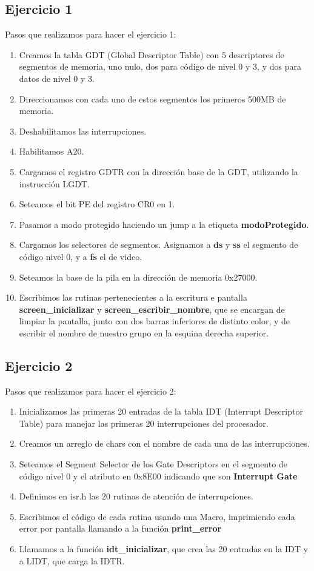 \documentclass[a4paper,10pt]{article}
\begin{document}
\subsection{Ejercicio 1}
Pasos que realizamos para hacer el ejercicio 1:
\begin{enumerate}
  \item Creamos la tabla GDT (Global Descriptor Table) con 5 descriptores de segmentos de memoria, uno nulo, dos para código de nivel 0 y 3, y dos para datos de nivel 0 y 3.
  \item Direccionamos con cada uno de estos segmentos los primeros 500MB de memoria.
  \item Deshabilitamos las interrupciones.
  \item Habilitamos A20.
  \item Cargamos el registro GDTR con la dirección base de la GDT, utilizando la instrucción LGDT.
  \item Seteamos el bit PE del registro CR0 en 1.
  \item Pasamos a modo protegido haciendo un jump a la etiqueta \textbf{modoProtegido}.
  \item Cargamos los selectores de segmentos. Asignamos a \textbf{ds} y \textbf{ss} el segmento de código nivel 0, y a \textbf{fs} el de video.
  \item Seteamos la base de la pila en la dirección de memoria 0x27000.
  \item Escribimos las rutinas pertenecientes a la escritura e pantalla \textbf{screen\_inicializar} y \textbf{screen\_escribir\_nombre}, que se encargan de limpiar la pantalla,
    junto con dos barras inferiores de distinto color, y de escribir el nombre de nuestro grupo en la esquina derecha superior. 
\end{enumerate}

\subsection{Ejercicio 2}
Pasos que realizamos para hacer el ejercicio 2:
\begin{enumerate}
  \item Inicializamos las primeras 20 entradas de la tabla IDT (Interrupt Descriptor Table) para manejar las primeras 20 interrupciones del procesador.
  \item Creamos un arreglo de chars con el nombre de cada una de las interrupciones.
  \item Seteamos el Segment Selector de los Gate Descriptors en el segmento de código nivel 0 y el atributo en 0x8E00 indicando que son \textbf{Interrupt Gate}
  \item Definimos en isr.h las 20 rutinas de atención de interrupciones.
  \item Escribimos el código de cada rutina usando una Macro, imprimiendo cada error por pantalla llamando a la función \textbf{print\_error} 
  \item Llamamos a la función \textbf{idt\_inicializar}, que crea las 20 entradas en la IDT y a LIDT, que carga la IDTR.
\end{enumerate}
\end{document}
